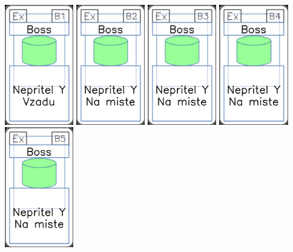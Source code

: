 \documentclass[a4paper]{article}
\begin{document}
	\includegraphics[width=3.0cm]{img-4_5}
	\includegraphics[width=3.0cm]{img-4_6}
	\includegraphics[width=3.0cm]{img-4_7}
	\includegraphics[width=3.0cm]{img-4_8}
	\includegraphics[width=3.0cm]{img-4_9}
\end{document}
